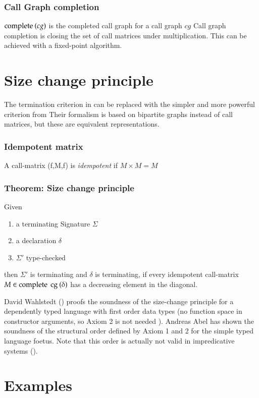 \subsubsection{Call Graph completion}
$\mathrm{complete}\:(cg)$ is the completed call graph for a call graph $cg$ 
Call graph completion is closing the set of call matrices under multiplication.
This can be achieved with a fixed-point algorithm.

\section{Size change principle}

The termination criterion in \cite{abelAltenkirch:predStRec} can be replaced with the
simpler and more powerful criterion from \cite{lee01sizechange}
Their formalism is based on bipartite graphs instead of call matrices, but these are
equivalent representations.


\subsubsection{Idempotent matrix}
A call-matrix (f,M,f) is \emph{idempotent} if $ M \times M = M $ 

\subsubsection{Theorem: Size change principle}
Given
\begin{enumerate}
\item
a terminating Signature $\Sigma$
\item
a declaration $\delta$
\item
$\Sigma'$ type-checked
\end{enumerate}
then $\Sigma'$ is terminating and $\delta$ is terminating, if every idempotent call-matrix  $ M \in \mathrm{complete}\: \: \mathrm{cg}\:(\delta)$ has a decreasing element in the diagonal.

David Wahlstedt (\cite{wahlstedt:phd:2007}) proofs the soundness of the size-change principle for a dependently typed language 
with first order data types (no function space in constructor arguments, so Axiom 2 is not needed ).
Andreas Abel has shown the soundness of the structural order defined by Axiom 1 and 2 for the simple typed
language foetus.
Note that this order is actually not valid in impredicative systems (\cite{abel:PhD}).

\section{Examples}

